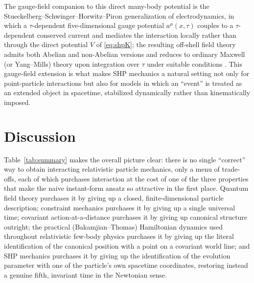 \documentclass[11pt]{article}
\begin{document}
The gauge-field companion to this direct many-body potential is the Stueckelberg--Schwinger--Horwitz--Piron generalization of electrodynamics, in which a $\tau$-dependent five-dimensional gauge potential $a^\mu(x,\tau)$ couples to a $\tau$-dependent conserved current and mediates the interaction locally rather than through the direct potential $V$ of \eqref{eq:shpK}; the resulting off-shell field theory admits both Abelian and non-Abelian versions and reduces to ordinary Maxwell (or Yang--Mills) theory upon integration over $\tau$ under suitable conditions \cite{Horwitz2015}. This gauge-field extension is what makes SHP mechanics a natural setting not only for point-particle interactions but also for models in which an ``event'' is treated as an extended object in spacetime, stabilized dynamically rather than kinematically imposed.

\section{Discussion}
\label{sec:discussion}

Table~\ref{tab:summary} makes the overall picture clear: there is no single ``correct'' way to obtain interacting relativistic particle mechanics, only a menu of trade-offs, each of which purchases interaction at the cost of one of the three properties that make the naive instant-form ansatz so attractive in the first place. Quantum field theory purchases it by giving up a closed, finite-dimensional particle description; constraint mechanics purchases it by giving up a single universal time; covariant action-at-a-distance purchases it by giving up canonical structure outright; the practical (Bakamjian--Thomas) Hamiltonian dynamics used throughout relativistic few-body physics purchases it by giving up the literal identification of the canonical position with a point on a covariant world line; and SHP mechanics purchases it by giving up the identification of the evolution parameter with one of the particle's own spacetime coordinates, restoring instead a genuine fifth, invariant time in the Newtonian sense.
\end{document}
